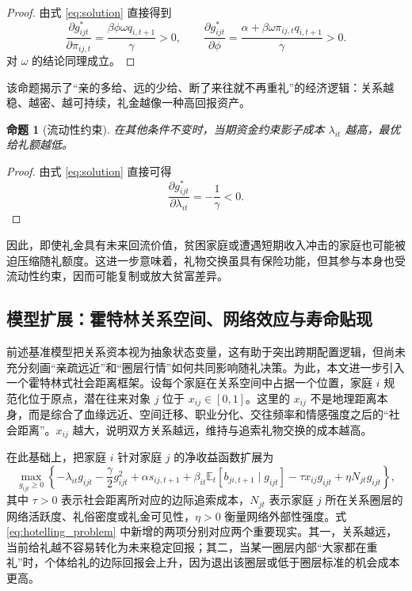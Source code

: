 \documentclass[12pt,a4paper]{ctexart}
\newtheorem{proposition}{命题}
\newcommand{\E}{\mathbb{E}}
\begin{document}
\begin{proof}
由式 \eqref{eq:solution} 直接得到
\[
\frac{\partial g_{ijt}^*}{\partial \pi_{ij,t}}
=
\frac{\beta\phi\omega q_{i,t+1}}{\gamma}
>0,\qquad
\frac{\partial g_{ijt}^*}{\partial \phi}
=
\frac{\alpha+\beta\omega\pi_{ij,t}q_{i,t+1}}{\gamma}
>0.
\]
对 $\omega$ 的结论同理成立。
\end{proof}

该命题揭示了“亲的多给、远的少给、断了来往就不再重礼”的经济逻辑：关系越稳、越密、越可持续，礼金越像一种高回报资产。

\begin{proposition}[流动性约束]
在其他条件不变时，当期资金约束影子成本 $\lambda_{it}$ 越高，最优给礼额越低。
\end{proposition}

\begin{proof}
由式 \eqref{eq:solution} 直接可得
\[
\frac{\partial g_{ijt}^*}{\partial \lambda_{it}}
=
-\frac{1}{\gamma}
<0.
\]
\end{proof}

因此，即使礼金具有未来回流价值，贫困家庭或遭遇短期收入冲击的家庭也可能被迫压缩随礼额度。这进一步意味着，礼物交换虽具有保险功能，但其参与本身也受流动性约束，因而可能复制或放大贫富差异。

\subsection{模型扩展：霍特林关系空间、网络效应与寿命贴现}

前述基准模型把关系资本视为抽象状态变量，这有助于突出跨期配置逻辑，但尚未充分刻画“亲疏远近”和“圈层行情”如何共同影响随礼决策。为此，本文进一步引入一个霍特林式社会距离框架。设每个家庭在关系空间中占据一个位置，家庭 $i$ 规范化位于原点，潜在往来对象 $j$ 位于 $x_{ij}\in[0,1]$。这里的 $x_{ij}$ 不是地理距离本身，而是综合了血缘远近、空间迁移、职业分化、交往频率和情感强度之后的“社会距离”。$x_{ij}$ 越大，说明双方关系越远，维持与追索礼物交换的成本越高。

在此基础上，把家庭 $i$ 针对家庭 $j$ 的净收益函数扩展为
\begin{equation}
\max_{g_{ijt}\geq 0}
\left\{
-\lambda_{it} g_{ijt}
-\frac{\gamma}{2}g_{ijt}^2
+\alpha s_{ij,t+1}
+\beta_{it}\E_t[b_{ji,t+1}\mid g_{ijt}]
-\tau x_{ij} g_{ijt}
+\eta N_{jt} g_{ijt}
\right\},
\label{eq:hotelling_problem}
\end{equation}
其中 $\tau>0$ 表示社会距离所对应的边际追索成本，$N_{jt}$ 表示家庭 $j$ 所在关系圈层的网络活跃度、礼俗密度或礼金可见性，$\eta>0$ 衡量网络外部性强度。式 \eqref{eq:hotelling_problem} 中新增的两项分别对应两个重要现实。其一，关系越远，当前给礼越不容易转化为未来稳定回报；其二，当某一圈层内部“大家都在重礼”时，个体给礼的边际回报会上升，因为退出该圈层或低于圈层标准的机会成本更高。
\end{document}
